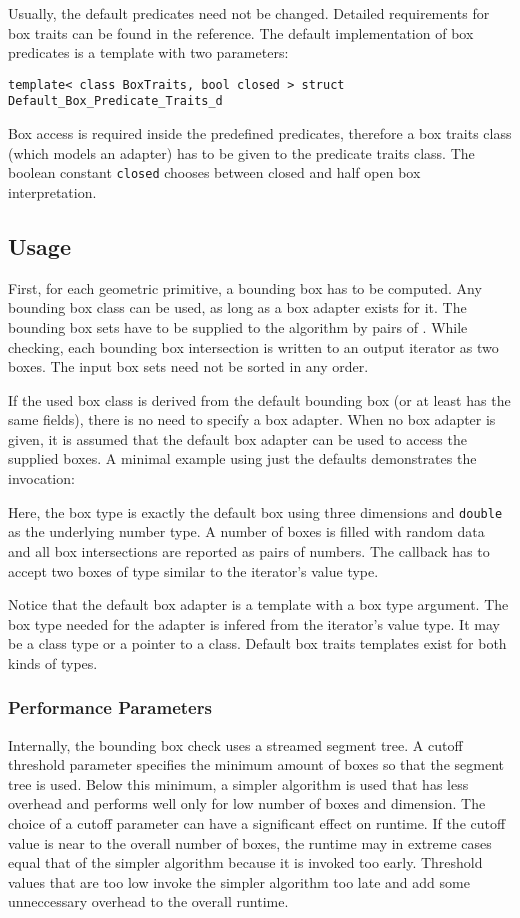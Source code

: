 Usually, the default predicates need not be changed. Detailed requirements for box traits can be found in the reference. The default implementation of box predicates is a template with two parameters:

\texttt{template< class BoxTraits, bool closed > struct Default\_Box\_Predicate\_Traits\_d}

Box access is required inside the predefined predicates, therefore a box traits class (which models an adapter) has to be given to the predicate traits class. The boolean constant \texttt{closed} chooses between closed and half open box interpretation.


\subsection*{Usage}
First, for each geometric primitive, a bounding box has to be computed. Any bounding box class can be used, as long as a box adapter exists for it. The bounding box sets have to be supplied to the algorithm by pairs of . While checking, each bounding box intersection is written to an output iterator as two boxes. The input box sets need not be sorted in any order.

If the used box class is derived from the default bounding box (or at least has the same fields), there is no need to specify a box adapter. When no box adapter is given, it is assumed that the default box adapter can be used to access the supplied boxes. A minimal example using just the defaults demonstrates the invocation:


Here, the box type is exactly the default box using three dimensions and \texttt{double} as the underlying number type. A number of boxes is filled with random data and all box intersections are reported as pairs of numbers. The callback has to accept two boxes of type similar to the iterator's value type.

Notice that the default box adapter is a template with a box type argument. The box type needed for the adapter is infered from the iterator's value type. It may be a class type or a pointer to a class. Default box traits templates exist for both kinds of types.

\subsubsection*{Performance Parameters}
Internally, the bounding box check uses a streamed segment tree. A cutoff threshold parameter specifies the minimum amount of boxes so that the segment tree is used. Below this minimum, a simpler algorithm is used that has less overhead and performs well only for low number of boxes and dimension. The choice of a cutoff parameter can have a significant effect on runtime. If the cutoff value is near to the overall number of boxes, the runtime may in extreme cases equal that of the simpler algorithm because it is invoked too early. Threshold values that are too low invoke the simpler algorithm too late and add some unneccessary overhead to the overall runtime.

